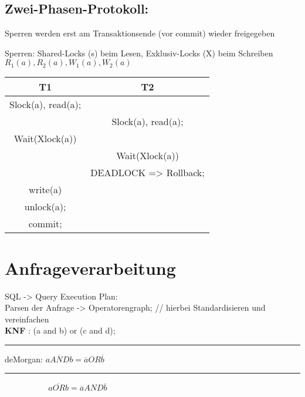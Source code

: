\subsection{Zwei-Phasen-Protokoll:} Sperren werden erst am Transaktionsende (vor commit) wieder freigegeben

Sperren: Shared-Locks (s) beim Lesen, Exklusiv-Locks (X) beim Schreiben
$R_1(a),R_2(a),W_1(a),W_2(a)$

\begin{tabular}{|c|c|}
\hline
T1 & T2 \\
\hline
Slock(a), read(a); & \\
& Slock(a), read(a);\\
Wait(Xlock(a)) & \\
& Wait(Xlock(a))\\
& DEADLOCK => Rollback;\\
write(a)&\\
unlock(a);&\\
commit;&\\
\hline
\end{tabular}\newpage



\section{Anfrageverarbeitung}
SQL -> Query Execution Plan:\\
Parsen der Anfrage -> Operatorengraph; // hierbei Standardisieren und vereinfachen  \\
\textbf{KNF} : (a and b) or (c and d); \\
\rule{2em}{0em}deMorgan: $\overline{a AND b} = \overline{a} OR \overline{b}$\\
\rule{2em}{0em}\textcolor{white}{deMorgan :} $\overline{a OR b} = \overline{a} AND \overline{b}$

